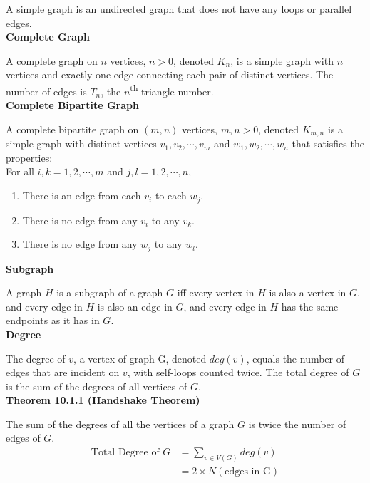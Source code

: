 \documentclass[a4paper]{article}
\newcommand{\subheading}[1]{{\scriptsize\textbf{#1}}}
\begin{document}
\begin{multicols*}{4}
A simple graph is an undirected graph that does not have any loops or parallel
edges.\\

\subheading{Complete Graph}

A complete graph on $n$ vertices, $n > 0$, denoted $K_n$, is a simple graph with
$n$ vertices and exactly one edge connecting each pair of distinct vertices. The
number of edges is $T_n$, the $n$\textsuperscript{th} triangle number.\\

\subheading{Complete Bipartite Graph}

A complete bipartite graph on $(m, n)$ vertices, $m, n > 0$, denoted $K_{m,n}$
is a simple graph with distinct vertices $v_1, v_2, \cdots, v_m$ and $w_1, w_2,
\cdots, w_n$ that satisfies the properties:\\

For all $i, k = 1, 2, \cdots, m$ and $j, l = 1, 2, \cdots, n$,
\begin{enumerate} \itemsep -0.5em
  \item There is an edge from each $v_i$ to each $w_j$.
  \item There is no edge from any $v_i$ to any $v_k$.
  \item There is no edge from any $w_j$ to any $w_l$.
\end{enumerate}

\subheading{Subgraph}

A graph $H$ is a subgraph of a graph $G$ iff every vertex in $H$ is also a
vertex in $G$, and every edge in $H$ is also an edge in $G$, and every edge in
$H$ has the same endpoints as it has in $G$.\\

\subheading{Degree}

The degree of $v$, a vertex of graph G, denoted $deg(v)$, equals the number of
edges that are incident on $v$, with self-loops counted twice. The total degree
of $G$ is the sum of the degrees of all vertices of $G$.\\

\subheading{Theorem 10.1.1 (Handshake Theorem)}

The sum of the degrees of all the vertices of a graph $G$ is twice the number of
edges of $G$.
\begin{align*}
  \text{Total Degree of $G$} &= \sum_{v \in V(G)} deg(v) \\
     &= 2 \times N(\text{edges in G})
\end{align*}


\end{multicols*}
\end{document}
